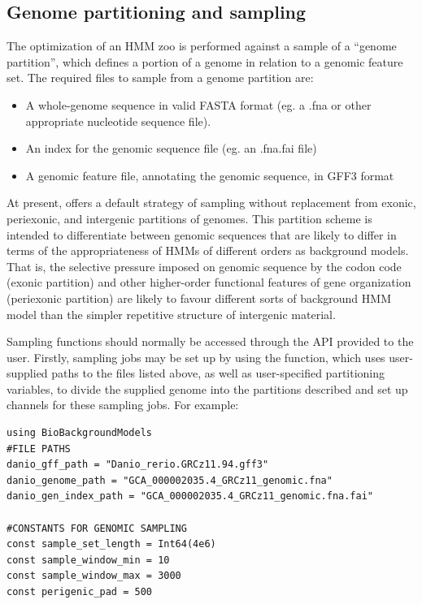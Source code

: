 \documentclass{ut-thesis}
\begin{document}
\begin{NoHyper}
\section{Genome partitioning and sampling}
The optimization of an HMM zoo is performed against a sample of a ``genome partition'', which defines a portion of a genome in relation to a genomic feature set. The required files to sample from a genome partition are:

\begin{itemize}
    \item A whole-genome sequence in valid FASTA format (eg. a .fna or other appropriate nucleotide sequence file).
    \item An index for the genomic sequence file (eg. an .fna.fai file)
    \item A genomic feature file, annotating the genomic sequence, in GFF3 format
\end{itemize}

At present,  offers a default strategy of sampling without replacement from exonic, periexonic, and intergenic partitions of genomes. This partition scheme is intended to differentiate between genomic sequences that are likely to differ in terms of the appropriateness of HMMs of different orders as background models. That is, the selective pressure imposed on genomic sequence by the codon code (exonic partition) and other higher-order functional features of gene organization (periexonic partition) are likely to favour different sorts of background HMM model than the simpler repetitive structure of intergenic material.

Sampling functions should normally be accessed through the API provided to the user. Firstly, sampling jobs may be set up by using the  function, which uses user-supplied paths to the files listed above, as well as user-specified partitioning variables, to divide the supplied genome into the partitions described and set up channels for these sampling jobs. For example:

\begin{verbatim}
using BioBackgroundModels
#FILE PATHS
danio_gff_path = "Danio_rerio.GRCz11.94.gff3"
danio_genome_path = "GCA_000002035.4_GRCz11_genomic.fna"
danio_gen_index_path = "GCA_000002035.4_GRCz11_genomic.fna.fai"

#CONSTANTS FOR GENOMIC SAMPLING
const sample_set_length = Int64(4e6)
const sample_window_min = 10
const sample_window_max = 3000
const perigenic_pad = 500


\end{verbatim}
\end{NoHyper}
\end{document}
